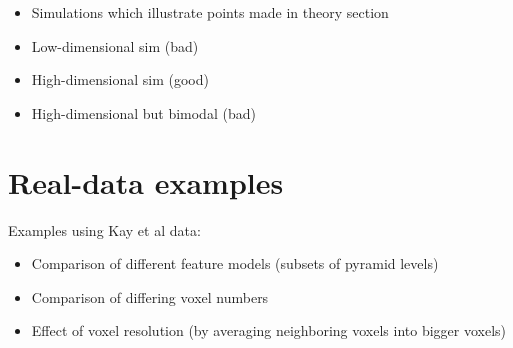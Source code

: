 \documentclass[12pt]{article}
\begin{document}
\begin{itemize}
\item Simulations which illustrate points made in theory section
\item Low-dimensional sim (bad)
\item High-dimensional sim (good)
\item High-dimensional but bimodal (bad)
\end{itemize}

\section{Real-data examples}

Examples using Kay et al data:
\begin{itemize}
\item Comparison of different feature models (subsets of pyramid levels)
\item Comparison of differing voxel numbers
\item Effect of voxel resolution (by averaging neighboring voxels into bigger voxels)
\end{itemize}

{}

\end{document}
